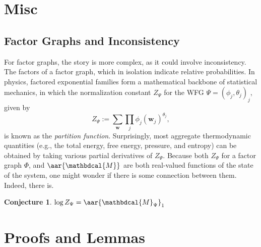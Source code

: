 \documentclass{article}
\theoremstyle{plain}
\newtheorem{conj}[theorem]{Conjecture}
\theoremstyle{definition}
\theoremstyle{remark}
\newcommand\mat[1]{\mathbf{#1}}
\newcommand{\dg}[1]{\mathbdcal{#1}}
\newcommand\commentout[1]{}
\newcommand{\pdgunit}{\mathrlap{\mathit 1} \mspace{2.3mu}\mathit 1}
\newcommand{\PDGof}[1]{{\dg M}_{#1}}
\newcommand{\ed}[3]{%
	\mathchoice%
	{#2\overset{\smash{\mskip-5mu\raisebox{-3pt}{${#1}$}}}{\xrightarrow{\hphantom{\scriptstyle {#1}}}} #3} %
	{#2\overset{\smash{\mskip-5mu\raisebox{-3pt}{$\scriptstyle {#1}$}}}{\xrightarrow{\hphantom{\scriptstyle {#1}}}} #3}%
	{#2\overset{\smash{\mskip-5mu\raisebox{-3pt}{$\scriptscriptstyle {#1}$}}}{\xrightarrow{\hphantom{\scriptscriptstyle {#1}}}} #3} %
	{#2\overset{\smash{\mskip-5mu\raisebox{-3pt}{$\scriptscriptstyle {#1}$}}}{\xrightarrow{\hphantom{\scriptscriptstyle {#1}}}} #3}} %
\begin{document}
$$  $$

\commentout{
	If, rather than fixing $\dg M$ and optimizing $p$, we fix $p$ and optimize $\dg M$,
	this same proces corresponds to an update, rather than an inference. For instance, in
	the case where $X = \pdgunit$, an observation $Y\!=\!y$  can be added to
	$\dg M$ in the form of an edge $\ed{\delta_y}{\pdgunit}Y$, getting the
	(possibly inconsistent) PDG $\dg M'$. The distribution $\bbr{M'}^*$ turns out
	to be the result of conditioning $\bbr{\dg M}^*$ on $Y\!=\!y$.  
}

\section{Misc}

\subsection{Factor Graphs and Inconsistency}
For factor graphs, the story is more complex, as it could involve
inconsistency. The factors of a
factor graph, which in isolation indicate relative probabilities. 
In physics, factored exponential families form a mathematical backbone of statistical
mechanics, in which the normalization constant 
$Z_{\Psi}$ for the WFG $\Psi = (\phi_j, \theta_j)_j$,
given by
$$
	Z_{\Psi} := \sum_{\mat w} \prod_{j} \phi_j(\mat w_j)^{\theta_j} 
	,
$$
is known as the \emph{partition function}. 
Surprisingly, most aggregate thermodynamic quantities 
(e.g., the total energy, free energy, pressure, and entropy) can
be obtained by taking various partial derivatives of $Z_\Psi$.
Because both $Z_{\Psi}$ for a factor graph $\Phi$, and $\aar{\dg M}$ are
both real-valued functions of the state of the system, one might wonder if
there is some connection between them. Indeed, there is.

\begin{conj}
	$\log Z_{\Psi} = \aar{\PDGof{\Psi}}_1$
\end{conj}

\appendix
\section{Proofs and Lemmas}
\end{document}
